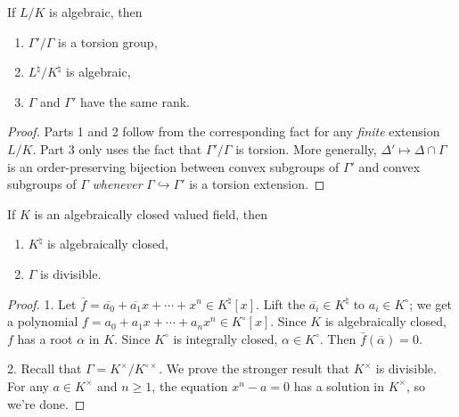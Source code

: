 \begin{corollary}
If $L/K$ is algebraic, then 
\begin{enumerate}
\item
$\Gamma'/\Gamma$ is a torsion group, 

\item
$L^\natural/K^\natural$ is algebraic, 

\item
$\Gamma$ and $\Gamma'$ have the same rank. 
\end{enumerate}
\end{corollary}
\begin{proof}
Parts 1 and 2 follow from the corresponding fact for any \emph{finite} 
extension $L/K$. Part 3 only uses the fact that $\Gamma'/\Gamma$ is torsion. 
More generally, $\Delta'\mapsto \Delta\cap \Gamma$ is an order-preserving 
bijection between convex subgroups of $\Gamma'$ and convex subgroups of 
$\Gamma$ \emph{whenever} $\Gamma\hookrightarrow \Gamma'$ is a torsion 
extension. 
\end{proof}

\begin{lemma}
If $K$ is an algebraically closed valued field, then 
\begin{enumerate}
\item
$K^\natural$ is algebraically closed, 

\item
$\Gamma$ is divisible. 
\end{enumerate}
\end{lemma}
\begin{proof}
1. Let 
$\bar f=\overline{a_0} + \overline{a_1} x+ \cdots + x^n\in K^\natural[x]$. Lift 
the $\overline{a_i}\in K^\natural$ to $a_i\in K^\circ$; we get a polynomial 
$f=a_0+a_1 x + \cdots + a_n x^n\in K^\circ[x]$. Since $K$ is algebraically 
closed, $f$ has a root $\alpha$ in $K$. Since $K^\circ$ is integrally closed, 
$\alpha\in K^\circ$. Then $\bar f(\overline\alpha)=0$. 

2. Recall that $\Gamma=K^\times/K^{\circ\times}$. We prove the stronger result 
that $K^\times$ is divisible. For any $a\in K^\times$ and $n\geqslant 1$, the 
equation $x^n-a=0$ has a solution in $K^\times$, so we're done. 
\end{proof}




